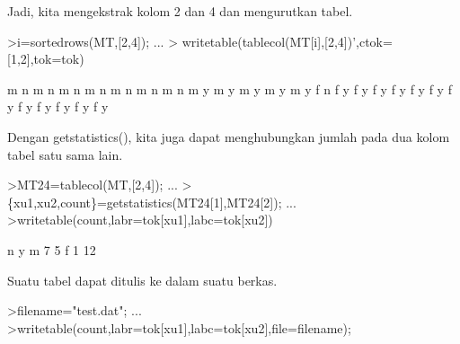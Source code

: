 \documentclass[a4paper,10pt]{article}
\begin{document}
\begin{eulernotebook}
\begin{eulercomment}
\begin{eulercomment}
\begin{eulercomment}
\begin{eulercomment}
\begin{eulercomment}
\begin{eulercomment}
\begin{eulercomment}
\begin{eulercomment}
\begin{eulercomment}
\begin{eulercomment}
\begin{eulercomment}
\begin{eulercomment}
\begin{eulercomment}
\begin{eulercomment}
\begin{eulercomment}
\begin{eulercomment}
\begin{eulercomment}
\begin{eulercomment}
\begin{eulercomment}
\begin{eulercomment}
\begin{eulercomment}
\begin{eulercomment}
\begin{eulercomment}
\begin{eulercomment}
\begin{eulercomment}
\begin{eulercomment}
\begin{eulercomment}
\begin{eulercomment}
\begin{eulercomment}
\begin{eulercomment}
\begin{eulercomment}
\begin{eulercomment}
\begin{eulercomment}
Jadi, kita mengekstrak kolom 2 dan 4 dan mengurutkan tabel.
\end{eulercomment}
\begin{eulerprompt}
>i=sortedrows(MT,[2,4]);  ...
>  writetable(tablecol(MT[i],[2,4])',ctok=[1,2],tok=tok)
\end{eulerprompt}
\begin{euleroutput}
           m         n
           m         n
           m         n
           m         n
           m         n
           m         n
           m         n
           m         y
           m         y
           m         y
           m         y
           m         y
           f         n
           f         y
           f         y
           f         y
           f         y
           f         y
           f         y
           f         y
           f         y
           f         y
           f         y
           f         y
           f         y
\end{euleroutput}
\begin{eulercomment}
Dengan getstatistics(), kita juga dapat menghubungkan jumlah pada dua
kolom tabel satu sama lain.
\end{eulercomment}
\begin{eulerprompt}
>MT24=tablecol(MT,[2,4]); ...
>\{xu1,xu2,count\}=getstatistics(MT24[1],MT24[2]); ...
>writetable(count,labr=tok[xu1],labc=tok[xu2])
\end{eulerprompt}
\begin{euleroutput}
                     n         y
           m         7         5
           f         1        12
\end{euleroutput}
\begin{eulercomment}
Suatu tabel dapat ditulis ke dalam suatu berkas.
\end{eulercomment}
\begin{eulerprompt}
>filename="test.dat"; ...
>writetable(count,labr=tok[xu1],labc=tok[xu2],file=filename);

\end{eulerprompt}
\end{eulercomment}
\end{eulercomment}
\end{eulercomment}
\end{eulercomment}
\end{eulercomment}
\end{eulercomment}
\end{eulercomment}
\end{eulercomment}
\end{eulercomment}
\end{eulercomment}
\end{eulercomment}
\end{eulercomment}
\end{eulercomment}
\end{eulercomment}
\end{eulercomment}
\end{eulercomment}
\end{eulercomment}
\end{eulercomment}
\end{eulercomment}
\end{eulercomment}
\end{eulercomment}
\end{eulercomment}
\end{eulercomment}
\end{eulercomment}
\end{eulercomment}
\end{eulercomment}
\end{eulercomment}
\end{eulercomment}
\end{eulercomment}
\end{eulercomment}
\end{eulercomment}
\end{eulercomment}
\end{eulernotebook}
\end{document}
